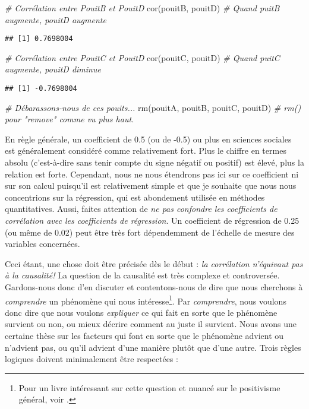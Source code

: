\documentclass[
]{book}
\newenvironment{Shaded}{\begin{snugshade}}{\end{snugshade}}
\newcommand{\CommentTok}[1]{\textcolor[rgb]{0.56,0.35,0.01}{\textit{#1}}}
\newcommand{\FunctionTok}[1]{\textcolor[rgb]{0.00,0.00,0.00}{#1}}
\newcommand{\NormalTok}[1]{#1}
\begin{document}
\begin{Shaded}
\begin{Highlighting}[]
\CommentTok{\# Corrélation entre PouitB et PouitD}
\FunctionTok{cor}\NormalTok{(pouitB, pouitD) }\CommentTok{\# Quand puitB augmente, pouitD augmente}
\end{Highlighting}
\end{Shaded}

\begin{verbatim}
## [1] 0.7698004
\end{verbatim}

\begin{Shaded}
\begin{Highlighting}[]
\CommentTok{\# Corrélation entre PouitC et PouitD}
\FunctionTok{cor}\NormalTok{(pouitC, pouitD) }\CommentTok{\# Quand puitC augmente, pouitD diminue}
\end{Highlighting}
\end{Shaded}

\begin{verbatim}
## [1] -0.7698004
\end{verbatim}

\begin{Shaded}
\begin{Highlighting}[]
\CommentTok{\# Débarassons{-}nous de ces pouits...}
\FunctionTok{rm}\NormalTok{(pouitA, pouitB, pouitC, pouitD) }\CommentTok{\# rm() pour "remove" comme vu plus haut.}
\end{Highlighting}
\end{Shaded}

En règle générale, un coefficient de 0.5 (ou de -0.5) ou plus en sciences sociales est généralement considéré comme relativement fort. Plus le chiffre en termes absolu (c'est-à-dire sans tenir compte du signe négatif ou positif) est élevé, plus la relation est forte. Cependant, nous ne nous étendrons pas ici sur ce coefficient ni sur son calcul puisqu'il est relativement simple et que je souhaite que nous nous concentrions sur la régression, qui est abondement utilisée en méthodes quantitatives. Aussi, faites attention de \emph{ne pas confondre les coefficients de corrélation avec les coefficients de régression}. Un coefficient de régression de 0.25 (ou même de 0.02) peut être très fort dépendemment de l'échelle de mesure des variables concernées.

Ceci étant, une chose doit être précisée dès le début : \emph{la corrélation n'équivaut pas à la causalité!} La question de la causalité est très complexe et controversée. Gardons-nous donc d'en discuter et contentons-nous de dire que nous cherchons à \emph{comprendre} un phénomène qui nous intéresse\footnote{Pour un livre intéressant sur cette question et nuancé sur le positivisme général, voir \citet{favre2005}.}. Par \emph{comprendre}, nous voulons donc dire que nous voulons \emph{expliquer} ce qui fait en sorte que le phénomène survient ou non, ou mieux décrire comment au juste il survient. Nous avons une certaine thèse sur les facteurs qui font en sorte que le phénomène advient ou n'advient pas, ou qu'il advient d'une manière plutôt que d'une autre. Trois règles logiques doivent minimalement être respectées :
\end{document}
